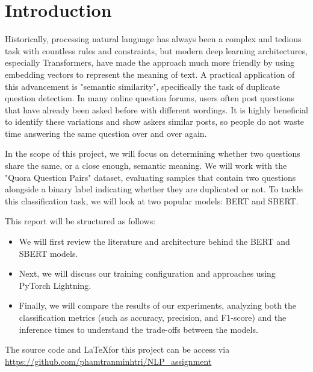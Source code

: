 \section{Introduction}

Historically, processing natural language has always been a complex and tedious task with countless rules and constraints, but modern deep learning architectures, especially Transformers, have made the approach much more friendly by using embedding vectors to represent the meaning of text. A practical application of this advancement is "semantic similarity", specifically the task of duplicate question detection. In many online question forums, users often post questions that have already been asked before with different wordings. It is highly beneficial to identify these variations and show askers similar posts, so people do not waste time answering the same question over and over again.

In the scope of this project, we will focus on determining whether two questions share the same, or a close enough, semantic meaning. We will work with the "Quora Question Pairs" dataset, evaluating samples that contain two questions alongside a binary label indicating whether they are duplicated or not. To tackle this classification task, we will look at two popular models: BERT and SBERT.

This report will be structured as follows:

\begin{itemize}
    \item We will first review the literature and architecture behind the BERT and SBERT models.


    \item Next, we will discuss our training configuration and approaches using PyTorch Lightning.


    \item Finally, we will compare the results of our experiments, analyzing both the classification metrics (such as accuracy, precision, and F1-score) and the inference times to understand the trade-offs between the models.
\end{itemize}

The source code and \LaTeX for this project can be access via \url{https://github.com/phamtranminhtri/NLP_assignment}